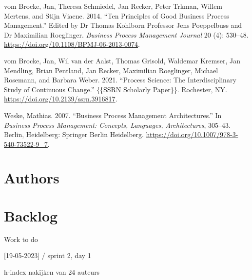 \documentclass[
  letterpaper,
  DIV=11,
  numbers=noendperiod]{scrreprt}
\newlength{\cslhangindent}
\newlength{\cslentryspacingunit} %
\newenvironment{CSLReferences}[2] %
 {%
  \setlength{\parindent}{0pt}
  \ifodd #1
  \let\oldpar\par
  \def\par{\hangindent=\cslhangindent\oldpar}
  \fi
  \setlength{\parskip}{#2\cslentryspacingunit}
 }%
 {}
\begin{document}
\begin{CSLReferences}{1}{0}
\leavevmode{}%
vom Brocke, Jan, Theresa Schmiedel, Jan Recker, Peter Trkman, Willem
Mertens, and Stijn Viaene. 2014. {``Ten Principles of Good Business
Process Management.''} Edited by Dr Thomas Kohlborn Professor Jens
Poeppelbuss and Dr Maximilian Roeglinger. \emph{Business Process
Management Journal} 20 (4): 530--48.
\url{https://doi.org/10.1108/BPMJ-06-2013-0074}.

\leavevmode{}%
vom Brocke, Jan, Wil van der Aalst, Thomas Grisold, Waldemar Kremser,
Jan Mendling, Brian Pentland, Jan Recker, Maximilian Roeglinger, Michael
Rosemann, and Barbara Weber. 2021. {``Process {Science}: {The
Interdisciplinary Study} of {Continuous Change}.''} \{\{SSRN Scholarly
Paper\}\}. {Rochester, NY}. \url{https://doi.org/10.2139/ssrn.3916817}.

\leavevmode{}%
Weske, Mathias. 2007. {``Business Process Management Architectures.''}
In \emph{Business Process Management: {Concepts}, Languages,
Architectures}, 305--43. {Berlin, Heidelberg}: {Springer Berlin
Heidelberg}. \url{https://doi.org/10.1007/978-3-540-73522-9_7}.

\end{CSLReferences}

\hypertarget{authors}{%
\chapter*{Authors}\label{authors}}


\cleardoublepage
{}
{}
\appendix

\hypertarget{backlog}{%
\chapter{Backlog}\label{backlog}}

Work to do

\hfill\break

{[}19-05-2023{]} / sprint 2, day 1

h-index nakijken van 24 auteurs

\newpage{}
\end{document}

